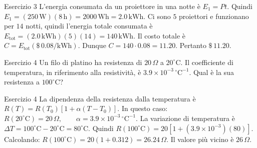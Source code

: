 \documentclass[a4paper]{article}
\begin{document}
\begin{snippetsolution}{Esercizio 3}
    L'energia consumata da un proiettore in una notte è
    \(E_1 = Pt.\)
    Quindi
    \(E_1 = (250\,\mathrm{W})(8\,\mathrm{h}) = 2000\,\mathrm{Wh} = 2.0\,\mathrm{kWh}.\)
    Ci sono \(5\) proiettori e funzionano per \(14\) notti, quindi l'energia
    totale consumata è
    \(E_{\mathrm{tot}} = (2.0\,\mathrm{kWh})(5)(14) = 140\,\mathrm{kWh}.\)
    Il costo totale è
    \(C = E_{\mathrm{tot}} \left(\$\,0.08/\mathrm{kWh}\right).\)
    Dunque
    \(C = 140 \cdot 0.08 = 11.20.\)
    Pertanto
    \(\boxed{\$\,11.20}.\)
\end{snippetsolution}
\begin{snippetexercise}{Esercizio 4}
    Un filo di platino ha resistenza di \(20\,\Omega\) a \(20^\circ\mathrm{C}\).
    Il coefficiente di temperatura, in riferimento alla resistività, è
    \(3.9 \times 10^{-3}\,{}^\circ\mathrm{C}^{-1}\).
    Qual è la sua resistenza a \(100^\circ\mathrm{C}\)?

\end{snippetexercise}
\begin{snippetsolution}{Esercizio 4}
    La dipendenza della resistenza dalla temperatura è
    \(R(T) = R(T_0)\left[1+\alpha(T-T_0)\right].\)
    In questo caso:
    \(R(20^\circ\mathrm{C}) = 20\,\Omega, \qquad \alpha = 3.9 \times 10^{-3}\,{}^\circ\mathrm{C}^{-1}.\)
    La variazione di temperatura è
    \(\Delta T = 100^\circ\mathrm{C} - 20^\circ\mathrm{C} = 80^\circ\mathrm{C}.\)
    Quindi
    \(R(100^\circ\mathrm{C}) = 20 \left[ 1+ \left(3.9 \times 10^{-3}\right)(80) \right].\)
    Calcolando:
    \(R(100^\circ\mathrm{C}) = 20(1+0.312) = 26.24\,\Omega.\)
    Il valore più vicino è
    \(\boxed{26\,\Omega}.\)
\end{snippetsolution}
\end{document}
